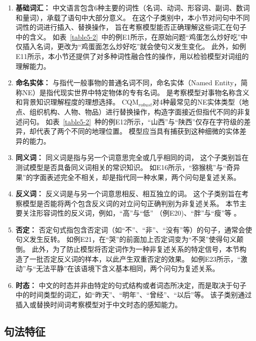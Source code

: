 

\begin{enumerate}
    \item \textbf{基础词汇：}
    中文语言包含6种主要的词性（名词、动词、形容词、副词、数词和量词），承载了语句中大部分意义。
    在这个子类别中，本小节对问句中不同词性的词进行插入、替换操作，
    旨在考察模型能否正确理解这些词汇在句子中的含义。
    如表~\ref{table5-2}~中的例E1所示，在原始问题{\kai“鸡蛋怎么炒好吃”}中仅插入名词，更改为{\kai“鸡蛋面怎么炒好吃”}就会使句义发生变化。
    此外，如例E11所示，本小节还提供了对多种词性融合性的操作，用以检验模型对词组的理解能力。
    \item \textbf{命名实体：}
    与指代一般事物的普通名词不同，命名实体（Named Entity，简称NE）是指代现实世界中特定物体的专有名词。
    是考察模型对事物名称含义和背景知识理解程度的理想选择。
    CQM$_{robust}$对4种最常见的NE实体类型（地点、组织机构、人物、物品）进行替换操作，构造字面接近但指代不同的非复述问句。
    如表~\ref{table5-2}~种的例E12所示，{\kai“山西”}与{\kai“陕西”}仅存在字符级的差异，却代表了两个不同的地理位置。
    模型应当具有捕获到这种细微的实体差异的能力。
    \item \textbf{同义词：}
    同义词是指与另一个词意思完全或几乎相同的词，
    这个子类别旨在测试模型是否具备同义词相关的常识知识。
    如E16所示，{\kai“猕猴桃”}与{\kai“奇异果”}的字面表述完全不相关，却是指代同一种水果，两个问句是复述关系。
    \item \textbf{反义词：}
    反义词是与另一个词意思相反、相互独立的词。
    这个子类别旨在考察模型是否能将两个包含反义词的对立问句正确判别为非复述关系。
    本节主要关注形容词性的反义词，例如，{\kai“高”}与{\kai“低”} （例E20)、{\kai“胖”}与{\kai“瘦”}等 。
    \item \textbf{否定：}
    否定句式指包含否定词（如{\kai“不”}、{\kai“非”}、{\kai“没有”}等）的句子，通常会使句义发生反转。
    如例E21，在{\kai“哭”}的前面加上否定词变为{\kai“不哭”}使得句义颠倒。
    此外，为了防止模型将否定词作为一种非复述关系的特定信号，本节构造了一批否定反义词的样本，以此产生双重否定的效果。
    如例E23所示，{\kai“激动”}与{\kai“无法平静”}在该语境下含义基本相同，两个问句为复述关系。
    \item \textbf{时态：}
    中文的时态并非由特定的句式结构或者词态所决定，而是取决于句子中的时间类型的词汇，如{\kai“昨天”}、{\kai“明年”}、{\kai“曾经”}、{\kai“以后”}等。
    该子类别通过插入或替换时间词考察模型对于中文时态的感知能力。
\end{enumerate}

\subsection{句法特征}\label{5.2.2 句法特征}

